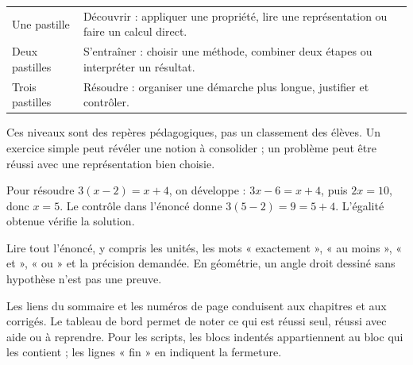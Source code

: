 \clearpage\thispagestyle{otFront}\label{mode-emploi}\fontsize{11}{15}\selectfont

\begin{tabularx}{\linewidth}{@{}lY@{}}\toprule
Une pastille & Découvrir : appliquer une propriété, lire une représentation ou faire un calcul direct.\\[3mm]
Deux pastilles & S’entraîner : choisir une méthode, combiner deux étapes ou interpréter un résultat.\\[3mm]
Trois pastilles & Résoudre : organiser une démarche plus longue, justifier et contrôler.\\\bottomrule
\end{tabularx}\par\medskip
Ces niveaux sont des repères pédagogiques, pas un classement des élèves.
Un exercice simple peut révéler une notion à consolider ; un problème peut
être réussi avec une représentation bien choisie.\par\medskip
\begin{exemple}Pour résoudre $3(x-2)=x+4$, on développe : $3x-6=x+4$, puis $2x=10$, donc $x=5$. Le contrôle dans l’énoncé donne $3(5-2)=9=5+4$. L’égalité obtenue vérifie la solution.\end{exemple}
\begin{attention}Lire tout l’énoncé, y compris les unités, les mots « exactement », « au moins », « et », « ou » et la précision demandée. En géométrie, un angle droit dessiné sans hypothèse n’est pas une preuve.\end{attention}
Les liens du sommaire et les numéros de page conduisent aux chapitres et
aux corrigés. Le tableau de bord permet de noter ce qui est réussi seul,
réussi avec aide ou à reprendre. Pour les scripts, les blocs indentés
appartiennent au bloc qui les contient ; les lignes « fin » en indiquent la fermeture.

\clearpage
